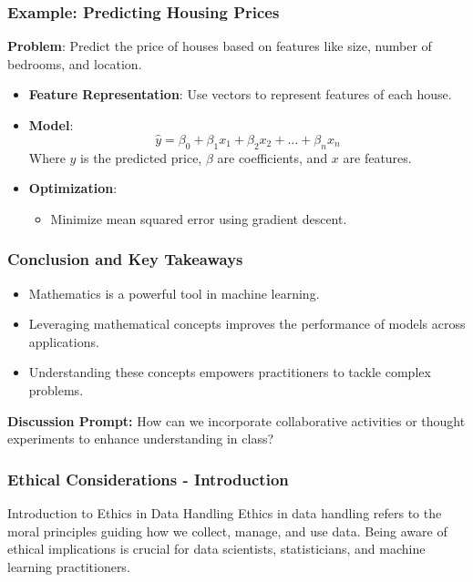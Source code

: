 \documentclass[aspectratio=169]{beamer}
\begin{document}
\begin{frame}[fragile]
    \frametitle{Example: Predicting Housing Prices}
    \textbf{Problem}: Predict the price of houses based on features like size, number of bedrooms, and location.

    \begin{itemize}
        \item \textbf{Feature Representation}: Use vectors to represent features of each house.
        
        \item \textbf{Model}:
        \begin{equation}
            \hat{y} = \beta_0 + \beta_1 x_1 + \beta_2 x_2 + \ldots + \beta_n x_n
        \end{equation}
        Where \( \hat{y} \) is the predicted price, \( \beta \) are coefficients, and \( x \) are features.

        \item \textbf{Optimization}: 
        \begin{itemize}
            \item Minimize mean squared error using gradient descent.
        \end{itemize}
    \end{itemize}
\end{frame}

\begin{frame}[fragile]
    \frametitle{Conclusion and Key Takeaways}
    \begin{itemize}
        \item Mathematics is a powerful tool in machine learning.
        \item Leveraging mathematical concepts improves the performance of models across applications.
        \item Understanding these concepts empowers practitioners to tackle complex problems.
    \end{itemize}
    
    \textbf{Discussion Prompt:} How can we incorporate collaborative activities or thought experiments to enhance understanding in class?
\end{frame}

\begin{frame}[fragile]
    \frametitle{Ethical Considerations - Introduction}
    \begin{block}{Introduction to Ethics in Data Handling}
        Ethics in data handling refers to the moral principles guiding how we collect, manage, and use data. 
        Being aware of ethical implications is crucial for data scientists, statisticians, and machine learning practitioners.
    \end{block}
\end{frame}
\end{document}

